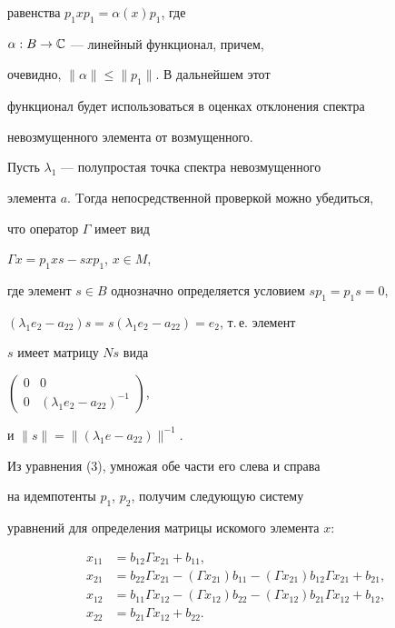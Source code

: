 равенства $p_1xp_1=\alpha(x)p_1$, где\linebreak


$\alpha:B\rightarrow\Bbb{C}$ --- линейный функционал, причем,


очевидно, $\|\alpha\|\leq\|p_1\|$. В дальнейшем этот


функционал будет использоваться в оценках отклонения спектра


невозмущенного элемента от возмущенного.





Пусть $\lambda_1$ --- полупростая точка спектра невозмущенного


элемента $a$. Tогда непосредственной проверкой можно убедиться,


что оператор $\Gamma$ имеет вид


$\Gamma x=p_1xs-sxp_1$, $x\in M$,


где элемент $s\in B$ однозначно определяется условием $sp_1=p_1s=0$,


$(\lambda_1e_2-a_{22})s=s(\lambda_1e_2-a_{22})=e_2$, т.\,е. элемент


$s$ имеет матрицу $Ns$ вида


$\left(\begin{smallmatrix}


0 & 0\\0 & (\lambda_1e_2-a_{22})^{-1}


\end{smallmatrix}\right)$,


и $\|s\|=\|(\lambda_1e-a_{22})\|^{-1}$.





Из уравнения (3), умножая обе части его слева и справа


на идемпотенты $p_1$, $p_2$, получим следующую систему 


уравнений для определения матрицы искомого элемента $x$:


\begin{align}


x_{11}&=b_{12}\Gamma x_{21}+b_{11},\\


x_{21}&=b_{22}\Gamma x_{21}-(\Gamma x_{21})b_{11}-


(\Gamma x_{21})b_{12}\Gamma x_{21}+b_{21},\\


x_{12}&=b_{11}\Gamma x_{12}-(\Gamma x_{12})b_{22}-


(\Gamma x_{12})b_{21}\Gamma x_{12}+b_{12},\\


x_{22}&=b_{21}\Gamma x_{12}+b_{22}.


\end{align}





